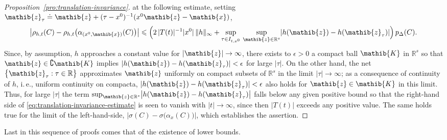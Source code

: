 \documentclass[a4paper,a4paper]{article}
\numberwithin{equation}{section}
\newcommand{\Rbb}{\mathbb{R}}
\newcommand{\Kib}{\mathib{K}}
\newcommand{\xib}{\mathib{x}}
\newcommand{\zib}{\mathib{z}}
\newcommand{\Rs}{\mathbb{R}^s}
\newcommand{\ax}{\alpha_x}
\theoremstyle{definition}
\theoremstyle{plain}
\theoremstyle{remark}
\newcommand{\bset}[1]{\bigl\{ #1 \bigr\}}
\newcommand{\abs}[1]{\lvert #1 \rvert}
\newcommand{\babs}[1]{\bigl\lvert #1 \bigr\rvert}
\newcommand{\norm}[1]{\lVert #1 \rVert}
\newcommand{\pDx}[1]{p_\Delta ( #1 )}
\begin{document}
\begin{proof}[Proposition~\ref{pro:translation-invariance}]
    at the following estimate, setting $\zib_\tau \doteq \zib + ( \tau
    - x^0 )^{-1} ( x^0 \zib - \xib )$, 
    \begin{equation}
      \label{eq:translation-invariance-estimate}
      \babs{\rho_{h , t} ( C ) - \rho_{h , t} \bigl( \alpha_{( x^0
      ,\xib )} ( C ) \bigr)} \leqslant \Bigl( 2 \, \abs{T ( t )}^{-1}
      \abs{x^0} \, \norm{h}_\infty + \sup_{\tau \in I_{t , x^0}} \,
      \sup_{\zib \in \Rs} \abs{h ( \zib ) - h ( \zib_\tau )} \Bigr) \,
      \pDx{C} \text{.}
    \end{equation}
    Since, by assumption, $h$ approaches a constant value for
    $\abs{\zib} \rightarrow \infty$, there exists to $\epsilon > 0$ a
    compact ball $\Kib$ in $\Rs$ so that $\zib \in \complement \Kib$
    implies $\abs{h ( \zib ) - h ( \zib_\tau )} < \epsilon$ for large
    $\abs{\tau}$. On the other hand, the net $\bset{\zib_\tau : \tau
    \in \Rbb}$ approximates $\zib$ uniformly on compact subsets of
    $\Rs$ in the limit $\abs{\tau} \rightarrow \infty$; as a
    consequence of continuity of $h$, i.\,e., uniform continuity on
    compacta, $\abs{h ( \zib ) - h ( \zib_\tau )} < \epsilon$ also
    holds for $\zib \in \Kib$ in this limit. Thus, for large
    $\abs{\tau}$ the term $\sup_{\zib \in \Rs} \babs{h ( \zib ) - h (
    \zib_\tau )}$ falls below any given positive bound so that the
    right-hand side of \eqref{eq:translation-invariance-estimate}
    is seen to vanish with $\abs{t} \rightarrow \infty$, since then
    $\abs{T ( t )}$ exceeds any positive value. The same holds true
    for the limit of the left-hand-side, $\babs{\sigma ( C ) - \sigma
    \bigl( \ax ( C ) \bigr)}$, which establishes the assertion.
  \end{proof}
  Last in this sequence of proofs comes that of the existence of lower
  bounds.
\end{document}
